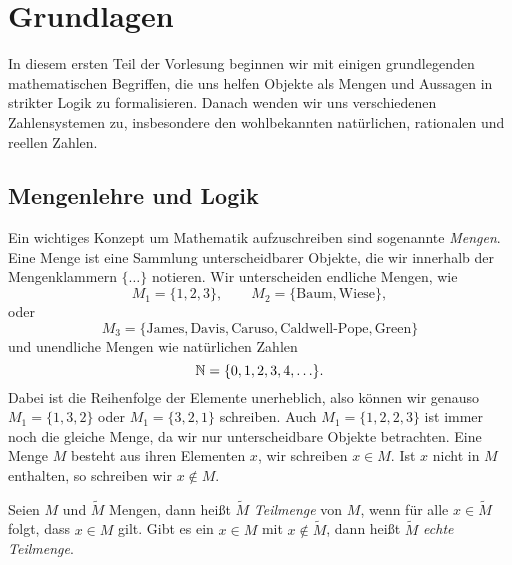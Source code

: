 \chapter{Grundlagen}
\label{\detokenize{grundlagen/grundlagen:grundlagen}}\label{\detokenize{grundlagen/grundlagen::doc}}
In diesem ersten Teil der Vorlesung beginnen wir mit einigen grundlegenden mathematischen Begriffen, die uns helfen Objekte als Mengen und Aussagen in strikter Logik zu formalisieren. Danach wenden wir uns verschiedenen Zahlensystemen zu, insbesondere den wohlbekannten natürlichen, rationalen und reellen Zahlen.


\section{Mengenlehre und Logik}
\label{\detokenize{grundlagen/mengenlogik:mengenlehre-und-logik}}\label{\detokenize{grundlagen/mengenlogik::doc}}
Ein wichtiges Konzept um Mathematik aufzuschreiben sind sogenannte \emph{Mengen}. Eine Menge ist eine Sammlung unterscheidbarer Objekte, die wir innerhalb der Mengenklammern \(\{ \ldots \}\) notieren. Wir unterscheiden endliche Mengen, wie
\begin{equation*}
 M_1 =  \{1,2,3\}, \qquad M_2=\{\text{Baum},\text{Wiese}\} ,
\end{equation*}
oder
\begin{equation*}
 M_3=\{\text{James}, \text{Davis}, \text{Caruso}, \text{Caldwell-Pope},\text{Green}\}
\end{equation*}
und unendliche Mengen wie natürlichen Zahlen
\begin{equation*}
\mathbb{N} =\{0,1,2,3,4,\ldots\}.
\end{equation*}
Dabei ist die Reihenfolge der Elemente unerheblich, also können wir genauso \( M_1 = \{1,3,2\}\) oder \(M_1=\{3,2,1\}\) schreiben. Auch \(M_1=\{1,2,2,3\}\) ist immer noch die gleiche Menge, da wir nur unterscheidbare Objekte betrachten.
Eine Menge \(M\) besteht aus ihren Elementen \(x\), wir schreiben \(x \in M\). Ist \(x\) nicht in \(M\) enthalten, so schreiben wir \(x \notin M\).
\label{grundlagen/mengenlogik:definition-0}
\begin{definition}{}{}



Seien \(M\) und \(\tilde M\) Mengen, dann heißt \(\tilde M\) \emph{Teilmenge} von \(M\), wenn für alle \(x \in \tilde M\) folgt, dass \(x \in M\) gilt. Gibt es ein \(x \in M\) mit \(x \notin \tilde M\), dann heißt \(\tilde M\) \emph{echte Teilmenge}.
\end{definition}

